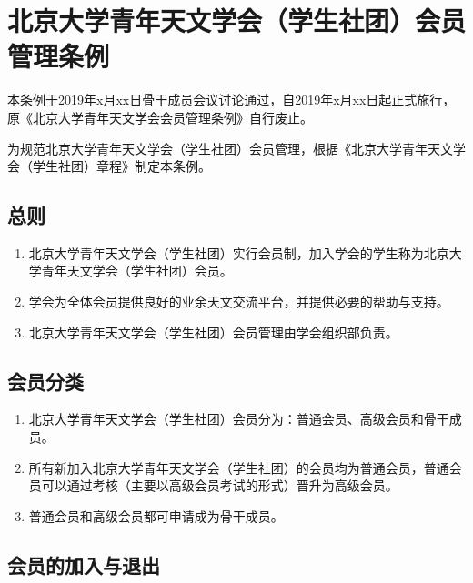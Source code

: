 \chapter{北京大学青年天文学会（学生社团）会员管理条例}

本条例于2019年x月xx日骨干成员会议讨论通过，自2019年x月xx日起正式施行，原《北京大学青年天文学会会员管理条例》自行废止。

为规范北京大学青年天文学会（学生社团）会员管理，根据《北京大学青年天文学会（学生社团）章程》制定本条例。

\section{总则}

\begin{enumerate}
    \item 北京大学青年天文学会（学生社团）实行会员制，加入学会的学生称为北京大学青年天文学会（学生社团）会员。
    
    \item 学会为全体会员提供良好的业余天文交流平台，并提供必要的帮助与支持。
    
    \item 北京大学青年天文学会（学生社团）会员管理由学会组织部负责。
\end{enumerate}

\section{会员分类}

\begin{enumerate}[resume]
    \item 北京大学青年天文学会（学生社团）会员分为：普通会员、高级会员和骨干成员。
    
    \item 所有新加入北京大学青年天文学会（学生社团）的会员均为普通会员，普通会员可以通过考核（主要以高级会员考试的形式）晋升为高级会员。
    
    \item 普通会员和高级会员都可申请成为骨干成员。
\end{enumerate}

\section{会员的加入与退出}

